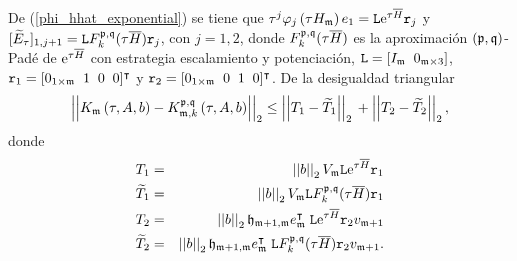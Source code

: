 De (\ref{phi_hhat_exponential}) se tiene que
$\tau^j \varphi_j\left( \tau H_{\mathfrak{m}} \right) e_1 = \mathtt{L} \mathrm{e}^{\tau \overline{H}} \mathtt{r}_j$
y
$[\widetilde{E}_{\tau}]_{1,j+1} = \mathtt{L} F_k^{\mathfrak{p},\mathfrak{q}}(\tau \overline{H}) \mathtt{r}_j$,
con $j=1,2$, donde $F_k^{\mathfrak{p},\mathfrak{q}}(\tau \overline{H})$ es la aproximación $(\mathfrak{p},\mathfrak{q})$-Padé de $\mathrm{e}^{\tau \overline{H}}$ con estrategia escalamiento y potenciación,
$ \mathtt{L}=[I_{\mathfrak{m}} \;\; 0_{\mathfrak{m}\times 3}] $, $\mathtt{r}_1=[0_{1\times \mathfrak{m}}\;\; 1 \;\;0 \;\;0]^\intercal$ y $\mathtt{r}_2=[0_{1\times \mathfrak{m}}\;\; 0 \;\;1 \;\;0]^\intercal$. De la desigualdad triangular
\begin{equation}\label{proffktheouneq}
\left\lvert\left\lvert   K_{\mathfrak{m}}\left( \tau , A , b \right) -
K_{\mathfrak{m},k}^{\mathfrak{p},\mathfrak{q}}\left( \tau, A , b \right)\right\rvert\right\rvert_2
\leq \left\lvert\left\lvert T_1 -
\widetilde{T}_1\right\rvert\right\rvert_2 \\
+\left\lvert\left\lvert T_2 - \widetilde{T}_2
\right\rvert\right\rvert_2,
\end{equation}
donde
\begin{eqnarray*}
	T_1&=&\left\lvert \left\lvert b \right\rvert \right\rvert_2 V_{\mathfrak{m}} \mathtt{L} \mathrm{e}^{\tau \overline{H}} \mathtt{r}_1\\
	\widetilde{T}_1&=&\left\lvert \left\lvert b \right\rvert \right\rvert_2 V_{\mathfrak{m}} \mathtt{L} F_k^{\mathfrak{p},\mathfrak{q}}(\tau \overline{H}) \mathtt{r}_1\\
	T_2&=&\left\lvert \left\lvert b \right\rvert \right\rvert_2 \mathfrak{h}_{\mathfrak{m}+1,\mathfrak{m}}e_{\mathfrak{m}}^\intercal\;\mathtt{L} \mathrm{e}^{\tau \overline{H}} \mathtt{r}_2 v_{\mathfrak{m}+1}\\
	\widetilde{T}_2&=&\left\lvert \left\lvert b \right\rvert \right\rvert_2 \mathfrak{h}_{\mathfrak{m}+1,\mathfrak{m}}e_{\mathfrak{m}}^\intercal\;\mathtt{L} F_k^{\mathfrak{p},\mathfrak{q}}(\tau \overline{H}) \mathtt{r}_2 v_{\mathfrak{m}+1}.
\end{eqnarray*}

